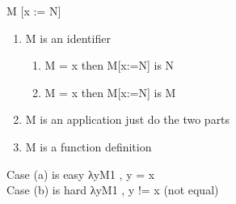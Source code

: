 \documentclass{article}
\begin{document}
\newline
\newline
\newline
\newline
M [x := N]
\begin{enumerate}
    \item M is an identifier 
    \begin{enumerate}
    \item M = x  then M[x:=N] is N
    \item M = x  then M[x:=N] is M
    \end{enumerate}
    \item M is an application just do the two parts 
    \item M is a function definition
\end{enumerate}
\newline
\newline
Case (a) is easy λyM1 , y = x \\
Case (b) is hard λyM1 , y != x (not equal)
\newline
\newline
\end{document}
